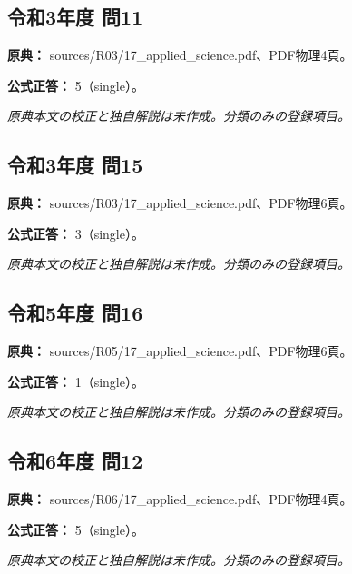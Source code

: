 \subsection{令和3年度 問11}
\label{q:r03-reg-applied-11}

\noindent\textbf{原典：} sources/R03/17\_applied\_science.pdf、PDF物理4頁。

\textbf{公式正答：} 5（single）。

\par\textit{原典本文の校正と独自解説は未作成。分類のみの登録項目。}

\subsection{令和3年度 問15}
\label{q:r03-reg-applied-15}

\noindent\textbf{原典：} sources/R03/17\_applied\_science.pdf、PDF物理6頁。

\textbf{公式正答：} 3（single）。

\par\textit{原典本文の校正と独自解説は未作成。分類のみの登録項目。}

\subsection{令和5年度 問16}
\label{q:r05-reg-applied-16}

\noindent\textbf{原典：} sources/R05/17\_applied\_science.pdf、PDF物理6頁。

\textbf{公式正答：} 1（single）。

\par\textit{原典本文の校正と独自解説は未作成。分類のみの登録項目。}

\subsection{令和6年度 問12}
\label{q:r06-reg-applied-12}

\noindent\textbf{原典：} sources/R06/17\_applied\_science.pdf、PDF物理4頁。

\textbf{公式正答：} 5（single）。

\par\textit{原典本文の校正と独自解説は未作成。分類のみの登録項目。}
